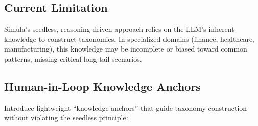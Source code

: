 \subsection{Current Limitation}

Simula's seedless, reasoning-driven approach relies on the LLM's inherent knowledge
to construct taxonomies. In specialized domains (finance, healthcare, manufacturing),
this knowledge may be incomplete or biased toward common patterns, missing critical
long-tail scenarios.

\subsection{Human-in-Loop Knowledge Anchors}

Introduce lightweight ``knowledge anchors'' that guide taxonomy construction without
violating the seedless principle:

